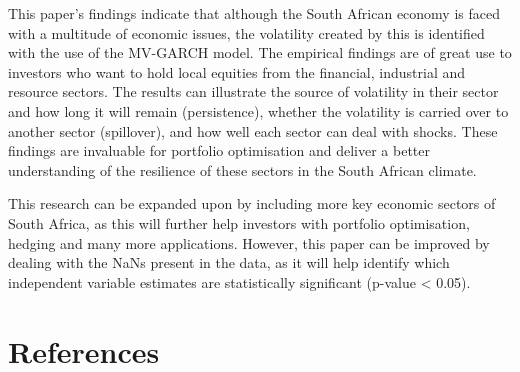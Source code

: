 \documentclass[11pt,preprint, authoryear]{elsarticle}
\numberwithin{equation}{section}
\numberwithin{figure}{section}
\numberwithin{table}{section}
\begin{document}
This paper's findings indicate that although the South African economy
is faced with a multitude of economic issues, the volatility created by
this is identified with the use of the MV-GARCH model. The empirical
findings are of great use to investors who want to hold local equities
from the financial, industrial and resource sectors. The results can
illustrate the source of volatility in their sector and how long it will
remain (persistence), whether the volatility is carried over to another
sector (spillover), and how well each sector can deal with shocks. These
findings are invaluable for portfolio optimisation and deliver a better
understanding of the resilience of these sectors in the South African
climate.

This research can be expanded upon by including more key economic
sectors of South Africa, as this will further help investors with
portfolio optimisation, hedging and many more applications. However,
this paper can be improved by dealing with the NaNs present in the data,
as it will help identify which independent variable estimates are
statistically significant (p-value \textless{} 0.05).

\newpage

\hypertarget{references}{%
\section*{References}\label{references}}

\hypertarget{ref.bib}{}
\end{document}
